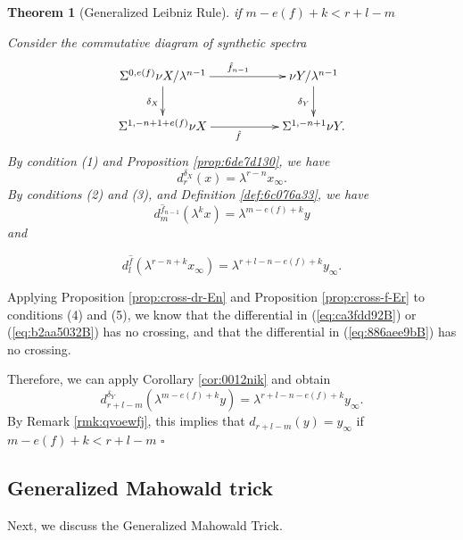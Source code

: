 \documentclass[12pt,a4paper]{article}
\renewenvironment{proof}{{\noindent\it\textbf{Proof}}\quad\it}{\hfill$\square$}
\newtheorem{theorem}[equation]{Theorem}
\newcommand{\Sus}{\Sigma}
\begin{document}
\begin{sloppy}
\begin{theorem}[Generalized Leibniz Rule]
    if $m-e(f)+k<r+l-m$
\end{theorem}

\begin{proof}
    Consider the commutative diagram of synthetic spectra
    $$\xymatrix{
        \Sus^{0,e(f)}\nu X/\lambda^{n-1} \ar[rr]^{\hat f_{n-1}}\ar[d]_{\delta_X} && \nu Y/\lambda^{n-1}\ar[d]_{\delta_Y}\\
        \Sus^{1,-n+1+e(f)} \nu X \ar[rr]_{\hat f} && \Sus^{1,-n+1}\nu Y.
    }$$
    By condition (1) and Proposition \ref{prop:6de7d130}, we have
    \begin{equation}\label{eq:ca3fdd92B}
        d^{\delta_X}_r(x)=\lambda^{r-n}x_\infty.
    \end{equation}
    By conditions (2) and (3), and Definition \ref{def:6c076a33}, we have
    \begin{equation}\label{eq:b2aa5032B}
        d^{\hat f_{n-1}}_m(\lambda^k x)=\lambda^{m-e(f)+k} y
    \end{equation}
    and
   
    \begin{equation}\label{eq:886aee9bB}
         d^{\hat f}_l(\lambda^{r-n+k}x_\infty)=\lambda^{r+l-n-e(f)+k}y_\infty.
    \end{equation}

    Applying Proposition \ref{prop:cross-dr-En} and Proposition \ref{prop:cross-f-Er} to conditions (4) and (5), we know that the differential in (\ref{eq:ca3fdd92B}) or (\ref{eq:b2aa5032B}) has no crossing, and that the differential in (\ref{eq:886aee9bB}) has no crossing.

    Therefore, we can apply Corollary \ref{cor:0012nik} and obtain
    $$d^{\delta_Y}_{r+l-m}(\lambda^{m-e(f)+k} y)=\lambda^{r+l-n-e(f)+k} y_\infty.$$
    By Remark \ref{rmk:qvoewfj}, this implies that
    $d_{r+l-m}(y)= y_\infty$
    if $m-e(f)+k<r+l-m$
\end{proof}



\subsection{Generalized Mahowald trick}
Next, we discuss the Generalized Mahowald Trick.


\end{sloppy}
\end{document}
